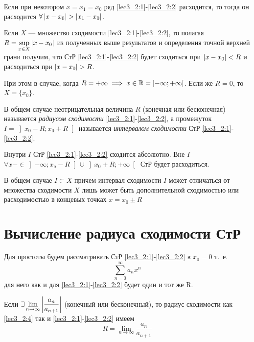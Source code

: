 \documentclass[../../main.tex]{subfiles}
\begin{document}
\begin{crl*}
	Если при некотором $x=x_1=x_0$ ряд \eqref{lec3_2:1}-\eqref{lec3_2:2}
	 расходится, то тогда он расходится $\forall \left|{x-x_0}\right| > \left|{x_1-x_0}\right|$.
\end{crl*}	
\begin{rem}
	Если $X$ --- множество сходимости \eqref{lec3_2:1}-\eqref{lec3_2:2}, 
	то полагая $R=\underset{x\in X}{\sup} \left|{x-x_0}\right|$ из полученных выше 
	результатов и определения точной верхней грани получим, 
	что СтР \eqref{lec3_2:1}-\eqref{lec3_2:2}
	будет сходиться при $\left|{x-x_0}\right| < R$ и расходиться при $\abs{x-x_0}>R$.
	
	При этом в случае, когда $R=+\infty \implies 
	x \in \mathbb{R}=\left]-\infty;+\infty\right[$.
	Если же $R=0$, то $X=\{x_0\}$.	
\end{rem}	
В общем  случае неотрицательная величина $R$ (конечная или бесконечная) 
называется \emph{радиусом сходимости}  \eqref{lec3_2:1}-\eqref{lec3_2:2}, а 
промежуток $I=\left]x_0-R;x_0+R\right[$ называется 
\emph{интервалом сходимости} 
СтР \eqref{lec3_2:1}-\eqref{lec3_2:2}.
	
Внутри $I$ СтР \eqref{lec3_2:1}-\eqref{lec3_2:2} сходится абсолютно. Вне $I$
$\forall x-\in\left]-\infty;x_o-R\right[\cup\left]x_0+R;+\infty\right[$
СтР будет расходиться.
	 
В общем случае $I\subset X$ причем интервал сходимости $I$ может
отличаться от множества сходимости $X$ лишь может быть дополнительной 
сходимостью или расходимостью в концевых точках $x=x_0\pm R$
	 
\section{Вычисление радиуса сходимости СтР}
	
Для простоты будем рассматривать СтР \eqref{lec3_2:1}-\eqref{lec3_2:2} в 
$x_0=0$
т.~е. 
\begin{equation}\label{lec3_2:4}
	\sum_{n=0}^{\infty}a_nx^n
\end{equation}
для него как и для \eqref{lec3_2:1}-\eqref{lec3_2:2} будет один и тот же
R.
\begin{thm}
	Если $\exists \lim\limits_{n\to\infty} \left|{\dfrac{a_n}{a_{n+1}}}\right|$ (конечный 
	или 
	бесконечный), то радиус сходимости как \eqref{lec3_2:4} так и 
	\eqref{lec3_2:1}-\eqref{lec3_2:2} имеем
	\begin{equation}
		R=\lim\limits_{n\rightarrow\infty}\frac{a_n}{a_{n+1}}
		\label{lec3_2:5}
	\end{equation}
\end{thm}	
\end{document}
